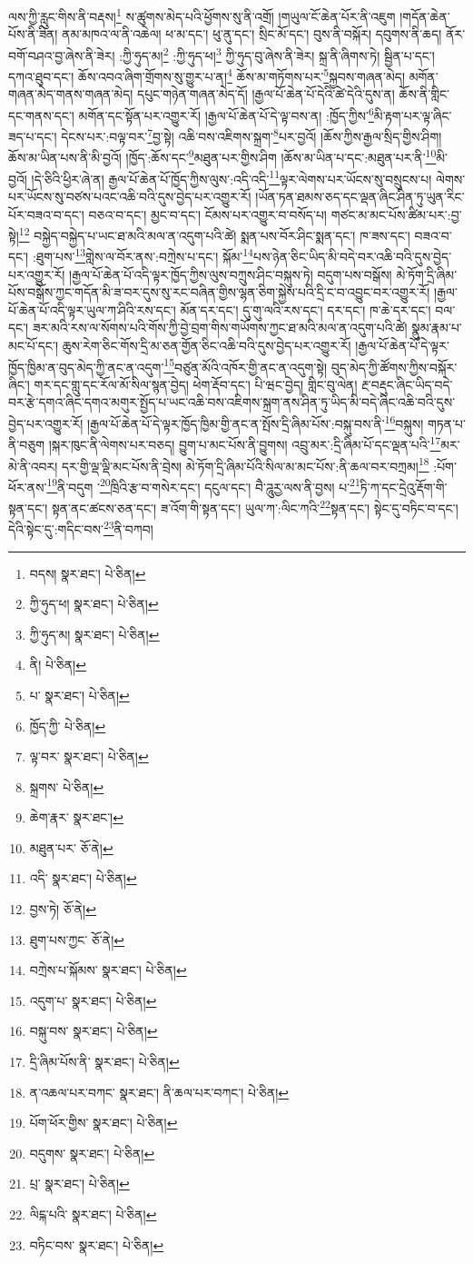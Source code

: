 ལས་ཀྱི་རླུང་གིས་ནི་བརྡས།\footnote{བདས།  སྣར་ཐང་།  པེ་ཅིན། } ས་ཚུགས་མེད་པའི་ཕྱོགས་སུ་ནི་འགྲོ། །གཡུལ་ངོ་ཆེན་པོར་ནི་འཇུག །གདོན་ཆེན་པོས་ནི་ཟིན། ནམ་མཁའ་ལ་ནི་འཆེལ། ཕ་མ་དང་། ཕུ་ནུ་དང་། སྲིང་མོ་དང་། བུས་ནི་བསྐོར། དབུགས་ནི་ཆད། ནོར་བགོ་བཤའ་བྱ་ཞེས་ནི་ཟེར། :ཀྱི་ཧུད་མ།\footnote{ཀྱི་ཧུད་ཕ།  སྣར་ཐང་།  པེ་ཅིན། } :ཀྱི་ཧུད་ཕ།\footnote{ཀྱི་ཧུད་མ།  སྣར་ཐང་།  པེ་ཅིན། } ཀྱི་ཧུད་བུ་ཞེས་ནི་ཟེར། སྐྲ་ནི་ཞིགས་ཏེ། སྦྱིན་པ་དང་། དཀའ་ཐུབ་དང་། ཆོས་འབའ་ཞིག་གྲོགས་སུ་གྱུར་པ་ན།\footnote{ནི།  པེ་ཅིན། } ཆོས་མ་གཏོགས་པར་\footnote{པ་  སྣར་ཐང་།  པེ་ཅིན། }སྐྱབས་གཞན་མེད། མགོན་གཞན་མེད་གནས་གཞན་མེད། དཔུང་གཉེན་གཞན་མེད་དོ། །རྒྱལ་པོ་ཆེན་པོ་དེའི་ཚེ་དེའི་དུས་ན། ཆོས་ནི་གླིང་དང་གནས་དང་། མགོན་དང་སྟོན་པར་འགྱུར་རོ། །རྒྱལ་པོ་ཆེན་པོ་དེ་ལྟ་བས་ན། :ཁྱོད་ཀྱིས་\footnote{ཁྱོད་ཀྱི་  པེ་ཅིན། }མི་རྟག་པར་ལྟ་ཞིང་ཟད་པ་དང་། དེངས་པར་:བལྟ་བར་\footnote{ལྟ་བར་  སྣར་ཐང་།  པེ་ཅིན། }བྱ་སྟེ། འཆི་བས་འཇིགས་སྐྲག་\footnote{སྐྲགས་  པེ་ཅིན། }པར་བྱའོ། །ཆོས་ཀྱིས་རྒྱལ་སྲིད་གྱིས་ཤིག། ཆོས་མ་ཡིན་པས་ནི་མི་བྱའོ། །ཁྱོད་:ཆོས་དང་\footnote{ཆེག་རྣར་  སྣར་ཐང་། }མཐུན་པར་གྱིས་ཤིག །ཆོས་མ་ཡིན་པ་དང་:མཐུན་པར་ནི་\footnote{མཐུན་པར་  ཅོ་ནེ། }མི་བྱའོ། །དེ་ཅིའི་ཕྱིར་ཞེ་ན། རྒྱལ་པོ་ཆེན་པོ་ཁྱོད་ཀྱིས་ལུས་:འདི་འདི་\footnote{འདི་  སྣར་ཐང་།  པེ་ཅིན། }ལྟར་ལེགས་པར་ཡོངས་སུ་བསྲུངས་པ། ལེགས་པར་ཡོངས་སུ་བཙས་པའང་འཆི་བའི་དུས་བྱེད་པར་འགྱུར་རོ། །ཡོན་ཏན་ཐམས་ཅད་དང་ལྡན་ཞིང་ཤིན་ཏུ་ཡུན་རིང་པོར་བཟའ་བ་དང་། བཅའ་བ་དང་། མྱང་བ་དང་། ངོམས་པར་འགྱུར་བ་བསོད་པ། གཙང་མ་མང་པོས་ཚིམ་པར་:བྱ་སྟེ།\footnote{བྱས་ཏེ།  ཅོ་ནེ། } བསྐྱེད་བསྐྱེད་པ་ཡང་ཐ་མའི་མལ་ན་འདུག་པའི་ཚེ། སྨན་པས་བོར་ཤིང་སྨན་དང་། ཁ་ཟས་དང་། བཟའ་བ་དང་། :ཐུག་པས་\footnote{ཐུག་པས་ཀྱང་  ཅོ་ནེ། }གླེས་ལ་བོར་ནས་:བཀྲེས་པ་དང་། སྐོམ་\footnote{བཀྲེས་པ་སྐོམས་  སྣར་ཐང་།  པེ་ཅིན། }པས་ཉེན་ཅིང་ཡིད་མི་བདེ་བར་འཆི་བའི་དུས་བྱེད་པར་འགྱུར་རོ། །རྒྱལ་པོ་ཆེན་པོ་འདི་ལྟར་ཁྱོད་ཀྱིས་ལུས་བཀྲུས་ཤིང་བསྐུས་ཏེ། བདུག་པས་བསྒོས། མེ་ཏོག་དྲི་ཞིམ་པོས་བསྒོས་ཀྱང་གདོན་མི་ཟ་བར་དུས་སུ་རང་བཞིན་གྱིས་ལྷན་ཅིག་སྐྱེས་པའི་དྲི་ང་བ་འབྱུང་བར་འགྱུར་རོ། །རྒྱལ་པོ་ཆེན་པོ་འདི་ལྟར་ཡུལ་ཀ་ཤིའི་རས་དང་། མོན་དར་དང་། དུ་གུ་ལའི་རས་དང་། དར་དང་། ཁ་ཆེ་དར་དང་། བལ་དང་། ཟར་མའི་རས་ལ་སོགས་པའི་གོས་ཀྱི་བྱེ་བྲག་གིས་གཡོགས་ཀྱང་ཐ་མའི་མལ་ན་འདུག་པའི་ཚེ། སྣུམ་རྣམ་པ་མང་པོ་དང་། ཆུས་རེག་ཅིང་གོས་དྲི་མ་ཅན་གྱོན་ཅིང་འཆི་བའི་དུས་བྱེད་པར་འགྱུར་རོ། །རྒྱལ་པོ་ཆེན་པོ་དེ་ལྟར་ཁྱོད་ཁྱིམ་ན་བུད་མེད་ཀྱི་ནང་ན་འདུག་\footnote{འདུག་པ་  སྣར་ཐང་།  པེ་ཅིན། }བཙུན་མོའི་འཁོར་གྱི་ནང་ན་འདུག་སྟེ། བུད་མེད་ཀྱི་ཚོགས་ཀྱིས་བསྐོར་ཞིང་། གར་དང་གླུ་དང་རོལ་མོ་སིལ་སྙན་བྱེད། ཕེག་རྡོབ་དང་། པི་ཝང་བྱེད། གླིང་བུ་ལེན། རྔ་བརྡུང་ཞིང་ཡིད་བདེ་བར་རྩེ་དགའ་ཞིང་དགའ་མགུར་སྤྱོད་པ་ཡང་འཆི་བས་འཇིགས་སྐྲག་ནས་ཤིན་ཏུ་ཡིད་མི་བདེ་ཞིང་འཆི་བའི་དུས་བྱེད་པར་འགྱུར་རོ། །རྒྱལ་པོ་ཆེན་པོ་དེ་ལྟར་ཁྱོད་ཁྱིམ་གྱི་ནང་ན་སྤོས་དྲི་ཞིམ་པོས་:བསྐུ་བས་ནི་\footnote{བསྐུ་བས་  སྣར་ཐང་།  པེ་ཅིན། }བསྐུས། གཏན་པ་ནི་བཅུག །སྐར་ཁུང་ནི་ལེགས་པར་བཅད། བྱུག་པ་མང་པོས་ནི་བྱུགས། འབྲུ་མར་:དྲི་ཞིམ་པོ་དང་ལྡན་པའི་\footnote{དྲི་ཞིམ་པོས་ནི་  སྣར་ཐང་།  པེ་ཅིན། }མར་མེ་ནི་འབར། དར་གྱི་ལྡ་ལྡི་མང་པོས་ནི་བྲེས། མེ་ཏོག་དྲི་ཞིམ་པོའི་སིལ་མ་མང་པོས་:ནི་ཆལ་བར་བཀྲམ།\footnote{ན་འཆལ་པར་བཀང་  སྣར་ཐང་། ནི་ཆལ་པར་བཀང་།  པེ་ཅིན། } :པོག་ཕོར་ནས་\footnote{པོག་ཕོར་གྱིས་  སྣར་ཐང་།  པེ་ཅིན། }ནི་བདུག ་\footnote{བདུགས་  སྣར་ཐང་།  པེ་ཅིན། }ཁྲིའི་རྩ་བ་གསེར་དང་། དངུལ་དང་། བཻ་ཌཱུརྱ་ལས་ནི་བྱས། པ་\footnote{པྲ་  སྣར་ཐང་།  པེ་ཅིན། }ཏི་ཀ་དང་དྲེའུ་རྡོག་གི་སྟན་དང་། སྟན་ནང་ཚངས་ཅན་དང་། ཟ་འོག་གི་སྟན་དང་། ཡུལ་ཀ་:ལིང་ཀའི་\footnote{ལིངྐ་པའི་  སྣར་ཐང་།  པེ་ཅིན། }སྟན་དང་། སྟེང་དུ་བཏིང་བ་དང་། དེའི་སྟེང་དུ་:གདིང་བས་\footnote{བཏིང་བས་  སྣར་ཐང་།  པེ་ཅིན། }ནི་བཀབ། 